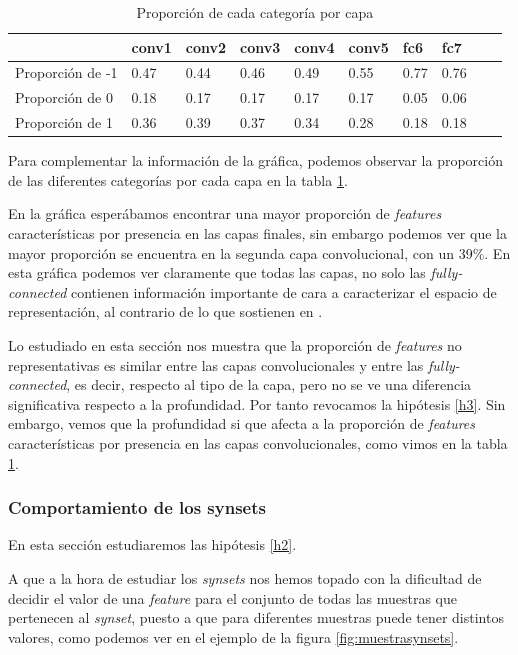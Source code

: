 \documentclass[12,twoside]{TFG-GM}
\theoremstyle{definition}
\theoremstyle{remark}
\begin{document}
\begin{table}[]
\centering
\caption{Proporción de cada categoría por capa}
\label{tab:categoryperlayer}
\begin{tabular}{|l|l|l|l|l|l|l|l|l|l|}
\hline
 & conv1 & conv2 & conv3 & conv4 & conv5 & fc6 & fc7 \\ \hline
 Proporción de -1 & 0.47 & 0.44 & 0.46 & 0.49 & 0.55 & 0.77 & 0.76 \\ \hline
 Proporción de 0 & 0.18 & 0.17 & 0.17 & 0.17 & 0.17 & 0.05 & 0.06 \\ \hline
 Proporción de 1 & 0.36 & 0.39 & 0.37 & 0.34 & 0.28 & 0.18 & 0.18 \\ 
\hline
\end{tabular}
\end{table}


Para complementar la información de la gráfica, podemos observar la proporción de las diferentes categorías por cada capa en la tabla \ref{tab:categoryperlayer}. 

En la gráfica esperábamos encontrar una mayor proporción de \textit{features} características por presencia en las capas finales, sin embargo podemos ver que la mayor proporción se encuentra en la segunda capa convolucional, con un 39\%. En esta gráfica podemos ver claramente que todas las capas, no solo las \textit{fully-connected} contienen información importante de cara a caracterizar el espacio de representación, al contrario de lo que sostienen en \cite{onlylastlayers}.

Lo estudiado en esta sección nos muestra que la proporción de \textit{features} no representativas es similar entre las capas convolucionales y entre las \textit{fully-connected}, es decir, respecto al tipo de la capa, pero no se ve una diferencia significativa respecto a la profundidad. Por tanto revocamos la hipótesis \ref{h3}. Sin embargo, vemos que la profundidad si que afecta a la proporción de \textit{features} características por presencia en las capas convolucionales, como vimos en la tabla \ref{tab:categoryperlayer}.  

\subsubsection{Comportamiento de los synsets} \label{sec:synsets}

En esta sección estudiaremos las hipótesis \ref{h2}. 

A que a la hora de estudiar los \textit{synsets} nos hemos topado con la dificultad de decidir el valor de una \textit{feature} para el conjunto de todas las muestras que pertenecen al \textit{synset}, puesto a que para diferentes muestras puede tener distintos valores, como podemos ver en el ejemplo de la figura \ref{fig:muestrasynsets}. 
\end{document}
